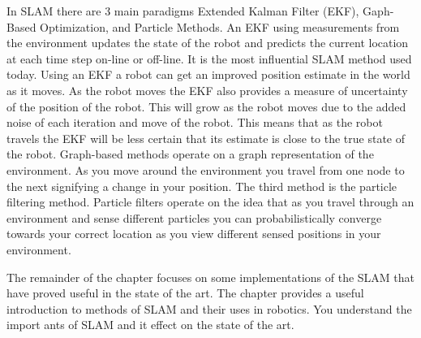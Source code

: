 \documentclass{article}
\begin{document}
In SLAM there are 3 main paradigms Extended Kalman Filter (EKF), Gaph-Based Optimization, and Particle Methods. An EKF using measurements from the environment updates the state of the robot and predicts the current location at each time step on-line or off-line. It is the most influential SLAM method used today. Using an EKF a robot can get an improved position estimate in the world as it moves. As the robot moves the EKF also provides a measure of uncertainty of the position of the robot. This will grow as the robot moves due to the added noise of each iteration and move of the robot. This means that as the robot travels the EKF will be less certain that its estimate is close to the true state of the robot. Graph-based methods operate on a graph representation of the environment. As you move around the environment you travel from one node to the next signifying a change in your position. The third method is the particle filtering method. Particle filters operate on the idea that as you travel through an environment and sense different particles you can probabilistically converge towards your correct location as you view different sensed positions in your environment.

The remainder of the chapter focuses on some implementations of the SLAM that have proved useful in the state of the art. The chapter provides a useful introduction to methods of SLAM and their uses in robotics. You understand the import ants of SLAM and it effect on the state of the art.


\cite{slam}
\end{document}
